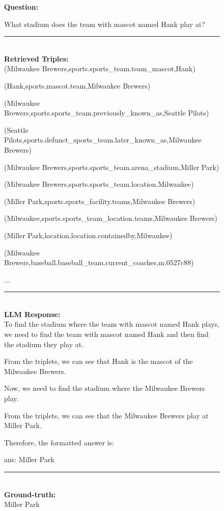 \begin{figure}
\begin{tcolorbox}[colback=gray!5!white, colframe=gray!75!black, title=CWQ-WebQTest-1320\_c5498ca807d2e1ec30d4c8fdd41f0bf7]
\scriptsize

\textbf{Question:}\\
\raggedright What stadium does the team with mascot named Hank play at?

\rule{\linewidth}{0.4pt}
\\

\textbf{Retrieved Triples:}\\
(Milwaukee Brewers,sports.sports\_team.team\_mascot,Hank)

(Hank,sports.mascot.team,Milwaukee Brewers)

(Milwaukee Brewers,sports.sports\_team.previously\_known\_as,Seattle Pilots)

(Seattle Pilots,sports.defunct\_sports\_team.later\_known\_as,Milwaukee Brewers)

(Milwaukee Brewers,sports.sports\_team.arena\_stadium,Miller Park)

(Milwaukee Brewers,sports.sports\_team.location,Milwaukee)

(Miller Park,sports.sports\_facility.teams,Milwaukee Brewers)

(Milwaukee,sports.sports\_team\_location.teams,Milwaukee Brewers)

(Miller Park,location.location.containedby,Milwaukee)

(Milwaukee Brewers,baseball.baseball\_team.current\_coaches,m.0527c88)

...

\rule{\linewidth}{0.4pt}
\\

\textbf{LLM Response:}\\
To find the stadium where the team with mascot named Hank plays, we need to find the team with mascot named Hank and then find the stadium they play at.



From the triplets, we can see that Hank is the mascot of the Milwaukee Brewers.



Now, we need to find the stadium where the Milwaukee Brewers play.



From the triplets, we can see that the Milwaukee Brewers play at Miller Park.



Therefore, the formatted answer is:



ans: Miller Park

\rule{\linewidth}{0.4pt}
\\
\textbf{Ground-truth:}\\
Miller Park

\end{tcolorbox}
\end{figure}





